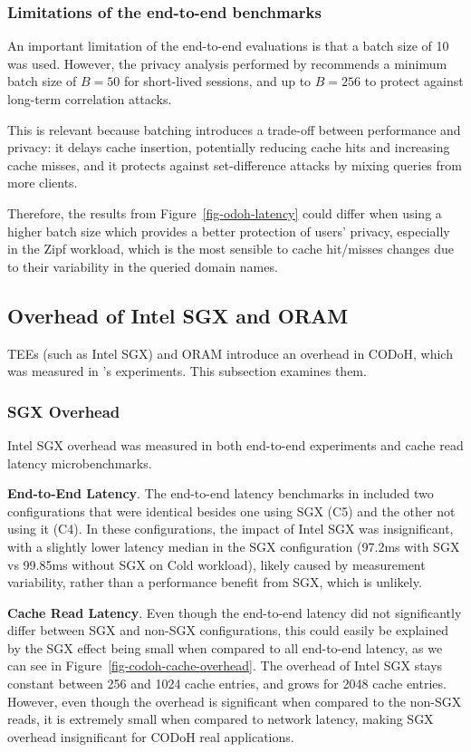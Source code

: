 \documentclass[a4paper]{article}
\begin{document}
\subsubsection{Limitations of the end-to-end benchmarks}

An important limitation of the end-to-end evaluations is that a batch size of 10 was used. However, the privacy analysis performed by \citet{niroula2026codoh} recommends a minimum batch size of $B=50$ for short-lived sessions, and up to $B=256$ to protect against long-term correlation attacks.

This is relevant because batching introduces a trade-off between performance and privacy: it delays cache insertion, potentially reducing cache hits and increasing cache misses, and it protects against set-difference attacks by mixing queries from more clients.

Therefore, the results from Figure~\ref{fig-odoh-latency} could differ when using a higher batch size which provides a better protection of users' privacy, especially in the Zipf workload, which is the most sensible to cache hit/misses changes due to their variability in the queried domain names.

\subsection{Overhead of Intel SGX and ORAM}

TEEs (such as Intel SGX) and ORAM introduce an overhead in CODoH, which was measured in \citet{niroula2026codoh}'s experiments. This subsection examines them.

\subsubsection{SGX Overhead}

Intel SGX overhead was measured in both end-to-end experiments and cache read latency microbenchmarks.

\textbf{End-to-End Latency}. The end-to-end latency benchmarks in \citet{niroula2026codoh} included two configurations that were identical besides one using SGX (C5) and the other not using it (C4). In these configurations, the impact of Intel SGX was insignificant, with a slightly lower latency median in the SGX configuration (97.2ms with SGX vs 99.85ms without SGX on Cold workload), likely caused by measurement variability, rather than a performance benefit from SGX, which is unlikely.

\textbf{Cache Read Latency}. Even though the end-to-end latency did not significantly differ between SGX and non-SGX configurations, this could easily be explained by the SGX effect being small when compared to all end-to-end latency, as we can see in Figure~\ref{fig-codoh-cache-overhead}. The overhead of Intel SGX stays constant between 256 and 1024 cache entries, and grows for 2048 cache entries. However, even though the overhead is significant when compared to the non-SGX reads, it is extremely small when compared to network latency, making SGX overhead insignificant for CODoH real applications.
\end{document}
